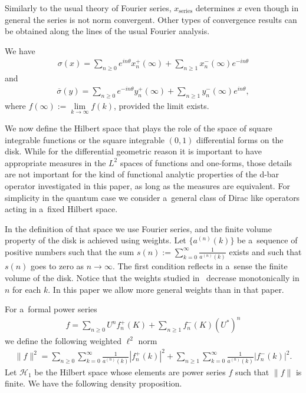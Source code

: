 \documentclass[11pt]{article}
\numberwithin{equation}{section}
\begin{document}
Similarly to the usual theory of Fourier series, $x_\textrm{series}$ determines $x$ even though in general the series is
not norm convergent.
Other types of convergence results can be obtained along the lines of the usual Fourier analysis.

We have
\begin{gather}
\label{lim_at_infty1}
\sigma(x) = \sum\limits_{n\ge0} e^{in\theta}x_n^+(\infty) + \sum\limits_{n\ge1} x_n^-(\infty)e^{-in\theta}
\end{gather}
and
\begin{gather}
\label{lim_at_infty2}
\overline{\sigma}(y) = \sum\limits_{n\ge0} e^{-in\theta} y_n^+(\infty) + \sum\limits_{n\ge1} y_n^-(\infty)e^{in\theta},
\end{gather}
where $f(\infty):=\lim\limits_{k\to\infty}f(k)$, provided the limit exists.

We now def\/ine the Hilbert space that plays the role of the space of square integrable functions or the square integrable
$(0,1)$ dif\/ferential forms on the disk.
While for the dif\/ferential geometric reason it is important to have appropriate measures in the $L^2$ spaces of
functions and one-forms, those details are not important for the kind of functional analytic properties of the d-bar
operator investigated in this paper, as long as the measures are equivalent.
For simplicity in the quantum case we consider a~general class of Dirac like operators acting in a~f\/ixed Hilbert space.

In the def\/inition of that space we use Fourier series, and the f\/inite volume property of the disk is achieved using
weights.
Let $\{a^{(n)}(k)\}$ be a~sequence of positive numbers such that the sum $s(n):=\sum\limits_{k=0}^\infty
\frac{1}{a^{(n)}(k)}$ exists and such that $s(n)$ goes to zero as $n\to\infty$.
The f\/irst condition ref\/lects in a~sense the f\/inite volume of the disk.
Notice that the weights studied in~\cite{KM1} decrease monotonically in $n$ for each $k$.
In this paper we allow more general weights than in that paper.

For a~formal power series
\begin{gather*}
f = \sum\limits_{n\ge0} U^n f_n^+(K) + \sum\limits_{n\ge1} f_n^-(K)(U^*)^n
\end{gather*}
we def\/ine the following weighted $\ell^2$ norm
\begin{gather*}
\|f\|^2 = \sum\limits_{n\ge 0} \sum\limits_{k=0}^\infty \frac{1}{a^{(n)}(k)}|f_n^+(k)|^2 +
\sum\limits_{n\ge1}\sum\limits_{k=0}^\infty \frac{1}{a^{(n)}(k)}|f_n^-(k)|^2.
\end{gather*}
Let $\mathcal{H}_1$ be the Hilbert space whose elements are power series $f$ such that $\|f\|$ is f\/inite.
We have the following density proposition.
\end{document}
